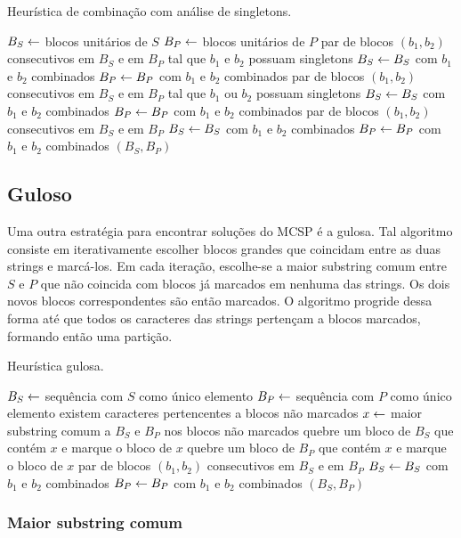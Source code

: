         \begin{algorithm}
        \caption{Heurística de combinação com análise de singletons.} \label{alg:combineS}
        \begin{codebox}
        \li $B_S \leftarrow$ blocos unitários de $S$
        \li $B_P \leftarrow$ blocos unitários de $P$
        \li \Para \Cada par de blocos $(b_1, b_2)$ consecutivos em $B_S$ e em $B_P$
        \zi tal que $b_1$ e $b_2$ possuam singletons \Faca
            \Do
        \li     $B_S \leftarrow B_S$ com $b_1$ e $b_2$ combinados
        \li     $B_P \leftarrow B_P$ com $b_1$ e $b_2$ combinados
            \End
        \li \Para \Cada par de blocos $(b_1, b_2)$ consecutivos em $B_S$ e em $B_P$
        \zi tal que $b_1$ ou $b_2$ possuam singletons \Faca
            \Do
        \li     $B_S \leftarrow B_S$ com $b_1$ e $b_2$ combinados
        \li     $B_P \leftarrow B_P$ com $b_1$ e $b_2$ combinados
            \End
        \li \Para \Cada par de blocos $(b_1, b_2)$ consecutivos em $B_S$ e em $B_P$ \Faca
            \Do
        \li     $B_S \leftarrow B_S$ com $b_1$ e $b_2$ combinados
        \li     $B_P \leftarrow B_P$ com $b_1$ e $b_2$ combinados
            \End
        \li \Devolva $(B_S, B_P)$
        \end{codebox}
    \end{algorithm}

\subsection{Guloso}

    Uma outra estratégia para encontrar soluções do MCSP é a gulosa. Tal algoritmo consiste em iterativamente escolher blocos grandes que coincidam entre as duas strings e marcá-los. Em cada iteração, escolhe-se a maior substring comum entre $S$ e $P$ que não coincida com blocos já marcados em nenhuma das strings. Os dois novos blocos correspondentes são então marcados. O algoritmo progride dessa forma até que todos os caracteres das strings pertençam a blocos marcados, formando então uma partição.

    \begin{algorithm}
        \caption{Heurística gulosa.} \label{alg:greedy}
        \begin{codebox}
        \li $B_S \leftarrow$ sequência com $S$ como único elemento
        \li $B_P \leftarrow$ sequência com $P$ como único elemento
        \li \Enquanto existem caracteres pertencentes a blocos não marcados \Faca
            \Do
        \li     $x \leftarrow$ maior substring comum a $B_S$ e $B_P$ nos blocos não marcados
        \li     quebre um bloco de $B_S$ que contém $x$ e marque o bloco de $x$
        \li     quebre um bloco de $B_P$ que contém $x$ e marque o bloco de $x$
            \End
        \li \Para \Cada par de blocos $(b_1, b_2)$ consecutivos em $B_S$ e em $B_P$ \Faca
            \Do
        \li     $B_S \leftarrow B_S$ com $b_1$ e $b_2$ combinados
        \li     $B_P \leftarrow B_P$ com $b_1$ e $b_2$ combinados
            \End
        \li \Devolva $(B_S, B_P)$
        \end{codebox}
    \end{algorithm}

    \subsubsection{Maior substring comum}

